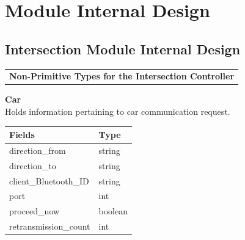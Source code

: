 \documentclass [10pt]{article}
\begin{document}
\section{Module Internal Design}


\subsection{Intersection Module Internal Design}
\begin{longtable}{p{}}

\rowcolor{tableCell}\textbf{Non-Primitive Types for the Intersection Controller} \\
\end{longtable}

\textbf{Car} \\
Holds information pertaining to car communication request. \\


\begin{longtable}{| p{ }   p{ }|} \hline 
    \textbf{Fields} & \textbf{Type} \\ \hline
     \rowcolor{tableCell}direction\_from & string \\\hline
     direction\_to& string \\\hline
     \rowcolor{tableCell}client\_Bluetooth\_ID & string \\\hline
     port & int \\\hline
     \rowcolor{tableCell}proceed\_now & boolean \\ \hline
     retransmission\_count & int \\\hline
\end{longtable}






\end{document}
